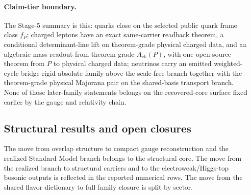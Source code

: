 \documentclass[11pt]{article}
\begin{document}
\paragraph{Claim-tier boundary.}
The Stage-5 summary is this: quarks close on the selected public quark frame class \(f_P\); charged leptons have an exact same-carrier readback theorem, a conditional determinant-line lift on theorem-grade physical charged data, and an algebraic mass readout from theorem-grade \(A_{\mathrm{ch}}(P)\), with one open source theorem from \(P\) to physical charged data; neutrinos carry an emitted weighted-cycle bridge-rigid absolute family above the scale-free branch together with the theorem-grade physical Majorana pair on the shared-basis transport branch. None of those later-family statements belongs on the recovered-core surface fixed earlier by the gauge and relativity chain.
\subsection{Structural results and open closures}\label{step5-structural-results-and-open-closures}

The move from overlap structure to compact gauge reconstruction and the realized Standard Model branch belongs to the structural core. The move from the realized branch to structural carriers and to the electroweak/Higgs-top bosonic outputs is reflected in the reported numerical rows. The move from the shared flavor dictionary to full family closure is split by sector.
\end{document}
